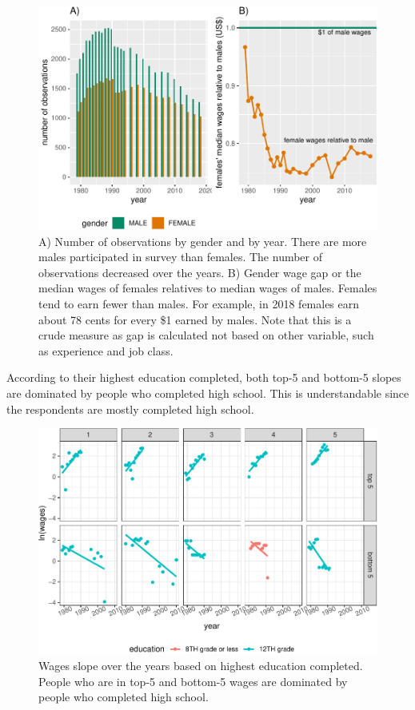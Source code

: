 \documentclass{article}
\begin{document}
\begin{figure}

{\centering \includegraphics[width=0.9\linewidth]{figures/gap-gender-1} 

}

\caption{A) Number of observations by gender and by year. There are more males participated in survey than females. The number of observations decreased over the years. B) Gender wage gap or the median wages of females relatives to median wages of males. Females tend to earn fewer than males. For example, in 2018 females earn about 78 cents for every \$1 earned by males. Note that this is a crude measure as gap is calculated not based on other variable, such as experience and job class.}\label{fig:gap-gender}
\end{figure}

According to their highest education completed, both top-5 and bottom-5 slopes are dominated by people who completed high school. This is understandable since the respondents are mostly completed high school.

\begin{figure}

{\centering \includegraphics[width=0.7\linewidth]{figures/slope-educ-1} 

}

\caption{Wages slope over the years based on highest education completed. People who are in top-5 and bottom-5 wages are dominated by people who completed high school.}\label{fig:slope-educ}
\end{figure}
\end{document}
